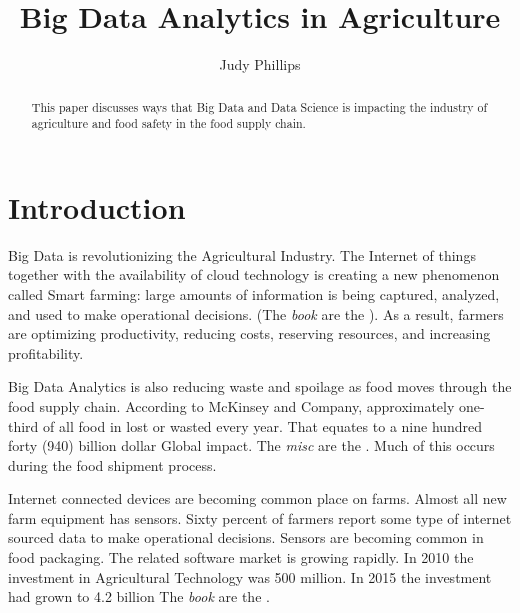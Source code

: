 \documentclass[sigconf]{acmart}
\begin{document}
\title{Big Data Analytics in Agriculture}


\author{Judy Phillips}

\renewcommand{\shortauthors}{B. Trovato et al.}


\begin{abstract}
This paper discusses ways that Big Data and Data Science is impacting the industry of agriculture and food safety in the food supply chain.
\end{abstract}



\maketitle

\section{Introduction}

Big Data is revolutionizing the Agricultural Industry. The Internet of things together with the availability of cloud technology is creating a new phenomenon called Smart farming: large amounts of information is being captured, analyzed, and used to make operational decisions.  (The \textit{book} are the \cite{book}). As a result, farmers are optimizing productivity, reducing costs, reserving resources, and increasing profitability. 

Big Data Analytics is also reducing waste and spoilage as food moves through the food supply chain.  According to McKinsey and Company,  approximately one-third of all food in lost or wasted every year. That equates to a nine hundred forty (940) billion dollar Global impact. The \textit{misc} are the \cite{www-google}. Much of this occurs during the food shipment process.  

Internet connected devices are becoming common place on farms. Almost all new farm equipment has sensors. Sixty percent of farmers report some type of internet sourced data to make operational decisions. Sensors are becoming common in food packaging. The related software market is growing rapidly. In 2010 the investment in Agricultural Technology was 500 million. In 2015 the investment had grown to 4.2 billion The \textit{book} are the \cite{book}. 
\end{document}

